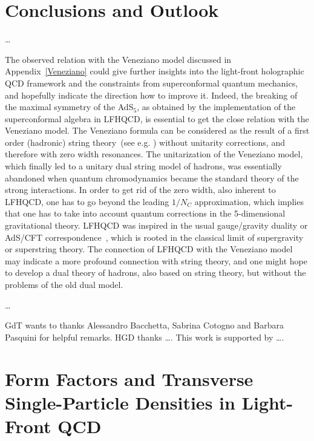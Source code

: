 \documentclass[aps,prd,preprint,groupedaddress]{revtex4-1}
\begin{document}
\section{ Conclusions and Outlook}


\dots

The observed relation with the Veneziano model discussed in Appendix~\ref{Veneziano} could give further insights into the light-front holographic QCD framework and the constraints from superconformal quantum mechanics, and hopefully indicate the direction how to improve it. Indeed, the  breaking of the maximal symmetry of the AdS$_5$, as obtained by the implementation of the superconformal algebra in LFHQCD, is essential to get the close relation with the Veneziano model.  The Veneziano formula can be considered as the result of a first order (hadronic) string theory~(see e.g. \cite{DiVecchia:2007vd})  without unitarity corrections, and therefore with zero width resonances. The unitarization of the Veneziano model, which finally led to a unitary dual string model of hadrons, was essentially abandoned when quantum chromodynamics became the standard theory of the strong interactions.  In order to get rid of the zero width, also inherent to LFHQCD,  one has  to go beyond the leading $1/N_C$ approximation, which implies that one has to take into account quantum corrections in the 5-dimensional gravitational theory. LFHQCD was inspired in the usual gauge/gravity duality or AdS/CFT correspondence~\cite{Maldacena:1997re}, which is rooted in the classical limit of supergravity or superstring theory.  The connection of LFHQCD with the Veneziano model may indicate a more profound connection with string theory, and one might hope to develop a dual theory of hadrons, also based on string theory, but without the problems of the old dual model. 


\dots


\acknowledgments

GdT wants to thanks Alessandro Bacchetta, Sabrina Cotogno and Barbara Pasquini for helpful remarks. HGD thanks \dots. This work is supported by \dots .



\appendix 




\section{ Form Factors and Transverse Single-Particle Densities in Light-Front QCD}
\end{document}
